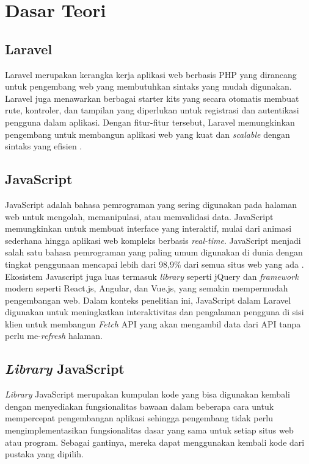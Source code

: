 \section{Dasar Teori}

\subsection{Laravel}
Laravel merupakan kerangka kerja aplikasi web berbasis PHP yang dirancang untuk pengembang web yang membutuhkan sintaks yang mudah digunakan. Laravel juga menawarkan berbagai starter kits yang secara otomatis membuat rute, kontroler, dan tampilan yang diperlukan untuk registrasi dan autentikasi pengguna dalam aplikasi. Dengan fitur-fitur tersebut, Laravel memungkinkan pengembang untuk membangun aplikasi web yang kuat dan \textit{scalable} dengan sintaks yang efisien \cite{Laravel}.

\subsection{JavaScript}
JavaScript adalah bahasa pemrograman yang sering digunakan pada halaman web untuk mengolah, memanipulasi, atau memvalidasi data. JavaScript memungkinkan untuk membuat interface yang interaktif, mulai dari animasi sederhana hingga aplikasi web kompleks berbasis \textit{real-time}. JavaScript menjadi salah satu bahasa pemrograman yang paling umum digunakan di dunia dengan tingkat penggunaan mencapai lebih dari 98,9\% dari semua situs web yang ada \cite{JavaScript}. Ekosistem Javascript juga luas termasuk \textit{library} seperti jQuery dan \textit{framework} modern seperti React.js, Angular, dan Vue.js, yang semakin mempermudah pengembangan web. Dalam konteks penelitian ini, JavaScript dalam Laravel digunakan untuk meningkatkan interaktivitas dan pengalaman pengguna di sisi klien untuk membangun \textit{Fetch} API yang akan mengambil data dari API tanpa perlu me-\textit{refresh} halaman.

\subsection{\textit{Library} JavaScript}
\textit{Library} JavaScript merupakan kumpulan kode yang bisa digunakan kembali dengan menyediakan fungsionalitas bawaan dalam beberapa cara untuk mempercepat pengembangan aplikasi sehingga pengembang tidak perlu mengimplementasikan fungsionalitas dasar yang sama untuk setiap situs web atau program. Sebagai gantinya, mereka dapat menggunakan kembali kode dari pustaka yang dipilih.

